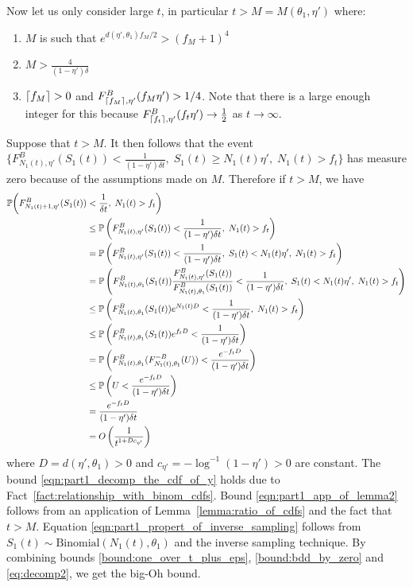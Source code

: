 \begin{myproof}[Proof.]
	Now let us only consider large $t$, in particular $t > M = M(\theta_1, \eta')$ where:
	\begin{enumerate}
		\item $M$ is such that $e^{d(\eta', \theta_1)f_{M}/2} > (f_M + 1)^4$
		\item $M > \frac{4}{(1-\eta')\delta }$
		\item $\ceil{f_M} > 0$ and $F^B_{\ceil{f_M},\eta'}(f_M \eta') > 1/4$. Note that there is a large enough integer for this because $F^B_{\ceil{f_t},\eta'}(f_t \eta') \to \frac{1}{2}$ as $t \to \infty$.
	\end{enumerate} 
	Suppose that $t > M$. It then follows that the event $\{F^B_{N_1(t), \eta'}(S_1(t)) < \frac{1}{(1-\eta')\delta t},\; S_1(t) \ge N_1(t) \eta', \; N_1(t) > f_t\}$ has measure zero because of the assumptions made on $M$. Therefore if $t > M$, we have
	\begin{align}
	\mathbb{P}\bigg(F^B_{N_1(t)+1,  \eta'}(S_1(t)) &< \frac{1}{\delta t }  , \; N_1(t) > f_t \bigg) \nonumber \\
	& \le \P{F^B_{N_1(t),  \eta'}(S_1(t)) < \frac{1}{(1-\eta')\delta t}, \; N_1(t) > f_t} \label{eqn:part1_decomp_the_cdf_of_y} \\ 
	& = \P{F^B_{N_1(t),  \eta'}(S_1(t)) < \frac{1}{(1-\eta')\delta t}, \; S_1(t) < N_1(t) \eta', \; N_1(t) > f_t} \nonumber \\ 
	& =  \P{F^B_{N_1(t),\theta_1}(S_1(t)) \frac{F^B_{N_1(t),\eta'}(S_1(t))}{F^B_{N_1(t),\theta_1}(S_1(t))} < \frac{1}{(1-\eta')\delta  t}, \;S_1(t) < N_1(t) \eta', \; N_1(t) > f_t} \nonumber \\
	& \le  \P{F_{N_1(t),\theta_1}^B(S_1(t))  e^{N_1(t) D} < \frac{1}{(1-\eta')\delta  t} , \; N_1(t) > f_t} \label{eqn:part1_app_of_lemma2} \\
	& \le  \P{F_{N_1(t),\theta_1}^B(S_1(t)) e^{f_t D} < \frac{1}{(1-\eta')\delta  t}} \nonumber \\
	& =  \P{F_{N_1(t),\theta_1}^B(F^{-B}_{N_1(t),\theta_1}(U)) < \frac{e^{-f_t D}}{(1-\eta')\delta  t} } \label{eqn:part1_propert_of_inverse_sampling}\\
	& \le  \P{U < \frac{e^{-f_t D}}{(1-\eta')\delta  t} } \nonumber \\  
	& =  \frac{e^{-f_t D}}{(1-\eta')\delta  t} \nonumber  \nonumber\\
	& = O\left( \frac{1}{t^{1+Dc_{\eta'}}} \right)  \label{bound:one_over_t_plus_eps} 
	\end{align}
	where $D = d(\eta',\theta_1) > 0$ and $c_{\eta'} = -\log^{-1}(1-\eta') > 0$ are constant. The bound \eqref{eqn:part1_decomp_the_cdf_of_y} holds due to Fact~\eqref{fact:relationship_with_binom_cdfs}. Bound \eqref{eqn:part1_app_of_lemma2} follows from an application of Lemma~\ref{lemma:ratio_of_cdfs} and the fact that $t > M$. Equation \eqref{eqn:part1_propert_of_inverse_sampling} follows from $S_1(t) \sim \text{Binomial}(N_1(t), \theta_1)$ and the inverse sampling technique. By combining bounds \eqref{bound:one_over_t_plus_eps}, \eqref{bound:bdd_by_zero} and \eqref{eq:decomp2}, we get the big-Oh bound.
\end{myproof}

